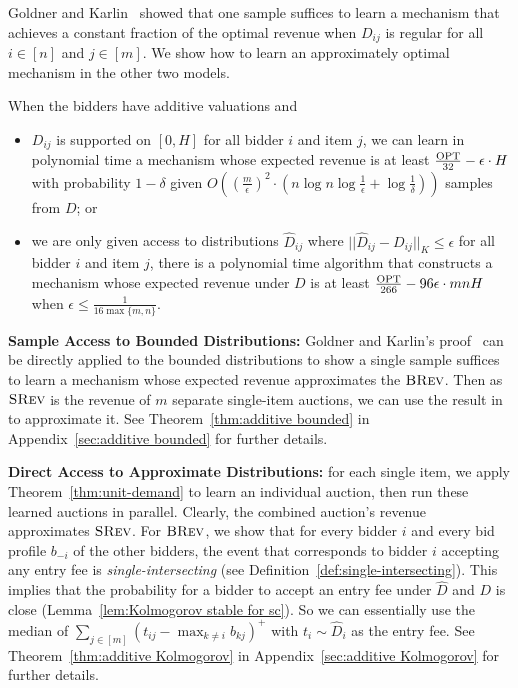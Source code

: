 Goldner and Karlin~\cite{GoldnerK16} showed that one sample suffices to learn a mechanism that achieves a constant fraction of the optimal revenue when $D_{ij}$ is regular for all $i\in[n]$ and $j\in[m]$. %
We show how to learn an approximately optimal mechanism in the other two models.
\begin{theorem}\label{thm:additive}
	When the bidders have additive valuations and\begin{itemize}
		\item $D_{ij}$ is supported on $[0,H]$ for all bidder $i$ and item $j$, we can learn in polynomial time a mechanism whose expected revenue is at least $\frac{\text{OPT}}{32}-{\epsilon}\cdot H$ with probability $1-\delta$ given $O\left(\left(\frac{m}{\epsilon}\right)^2 \cdot\left(n\log n\log \frac{1}{\epsilon}+\log\frac{1}{\delta} \right)\right)$ samples from $D$; or
		\item  we are only given access to distributions $\hat{D}_{ij}$ where $||\hat{D}_{ij}-D_{ij}||_K\leq \epsilon$ for all bidder $i$ and item $j$, there is a polynomial time algorithm that constructs a mechanism whose expected revenue under $D$ is at least $\frac{\text{OPT}}{266}-96\epsilon\cdot mnH$ when $\epsilon\leq \frac{1}{16\max\{m,n\}}$.
	\end{itemize}
\end{theorem}

\noindent\textbf{Sample Access to Bounded Distributions:} Goldner and Karlin's proof~\cite{GoldnerK16} can be directly applied to the bounded distributions to show a single sample suffices to learn a mechanism whose expected revenue approximates the $\textsc{BRev}$. Then as $\textsc{SRev}$ is the revenue of $m$ separate single-item auctions, we can use the result in~\cite{MorgensternR16} to approximate it. See Theorem~\ref{thm:additive bounded} in Appendix~\ref{sec:additive bounded} for further details.

\vspace{.05in}
\noindent\textbf{Direct Access to Approximate Distributions:} for each single item, we apply Theorem~\ref{thm:unit-demand} to learn an individual auction, then run these learned auctions in parallel. Clearly, the combined auction's revenue approximates $\textsc{SRev}$. For $\textsc{BRev}$, we show that for every bidder $i$ and every bid profile $b_{-i}$ of the other bidders, the event that corresponds to bidder $i$ accepting any entry fee is \emph{single-intersecting} (see Definition~\ref{def:single-intersecting}). This implies that the probability for a bidder to accept an entry fee under $\hat{D}$ and $D$ is close (Lemma~\ref{lem:Kolmogorov stable for sc}). So we can essentially use the median of $\sum_{j\in[m]}(t_{ij}-\max_{k\neq i} b_{kj})^+$ with $t_i\sim\hat{D}_i$ as the entry fee. See Theorem~\ref{thm:additive Kolmogorov} in Appendix~\ref{sec:additive Kolmogorov} for further details.
